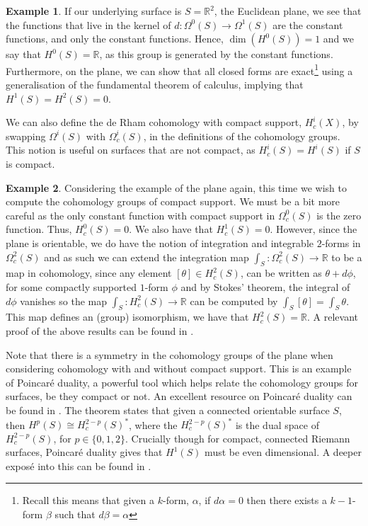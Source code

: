 \documentclass[11pt]{report}
\theoremstyle{definition}
\newtheorem*{example*}{Example}
\begin{document}
\begin{example*}
  If our underlying surface is $S=\mathbb{R}^2$, the Euclidean plane, we see that the functions that live in the kernel of $d:\Omega^0(S)\rightarrow\Omega^1(S)$ are the constant functions, and only the constant functions. Hence, $\dim(H^0(S)) = 1$ and we say that $H^0(S)=\mathbb{R}$, as this group is generated by the constant functions. Furthermore, on the plane, we can show that all closed forms are exact\footnote{Recall this means that given a $k$-form, $\alpha$, if $d\alpha = 0$ then there exists a $k-1$-form $\beta$ such that $d\beta = \alpha$} using a generalisation of the fundamental theorem of calculus, implying that $H^1(S)=H^2(S) = 0$.
\end{example*}
We can also define the de Rham cohomology with compact support, $H^i_c(X)$, by swapping $\Omega^i(S)$ with $\Omega_c^i(S)$, in the definitions of the cohomology groups. This notion is useful on surfaces that are not compact, as $H^i_c(S) = H^i(S)$ if $S$ is compact.
\begin{example*}
  Considering the example of the plane again, this time we wish to compute the cohomology groups of compact support. We must be a bit more careful as the only constant function with compact support in $\Omega^0_c(S)$ is the zero function. Thus, $H^0_c(S)=0$. We also have that $H^1_c(S)=0$. However, since the plane is orientable, we do have the notion of integration and integrable $2$-forms in $\Omega^2_c(S)$ and as such we can extend the integration map $\int_S : \Omega^2_c(S) \rightarrow \mathbb{R}$ to be a map in cohomology, since any element $[\theta] \in H^2_c(S)$, can be written as $\theta + d\phi$, for some compactly supported $1$-form $\phi$ and by Stokes' theorem, the integral of $d\phi$ vanishes so the map $\int_S:H^2_c(S)\rightarrow \mathbb{R}$
  can be computed by $\int_S [\theta] = \int_S \theta$. This map defines an (group) isomorphism, we have that $H^2_c(S)=\mathbb{R}$. A relevant proof of the above results can be found in \cite[Theorem 10.13]{calcohomo}.
\end{example*}
Note that there is a symmetry in the cohomology groups of the plane when considering cohomology with and without compact support. This is an example of Poincar\'{e} duality, a powerful tool which helps relate the cohomology groups for surfaces, be they compact or not. An excellent resource on Poincar\'{e} duality can be found in \cite[Chapter 13]{calcohomo}. The theorem states that given a connected orientable surface $S$, then $H^p(S) \cong H^{2-p}_c(S)^*$, where the $H^{2-p}_c(S)^*$ is the dual space of $H^{2-p}_c(S)$, for $p \in \{0,1,2\}$. Crucially though for compact, connected Riemann surfaces, Poincar\'{e} duality gives that $H^1(S)$ must be even dimensional. A deeper expos\'{e} into this can be found in \cite[p.130]{calcohomo}.
\end{document}
